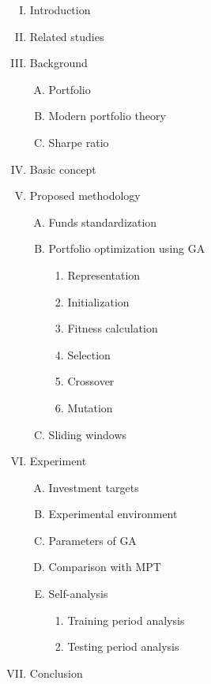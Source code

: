 \documentclass[polish,envcountsect,10pt]{article}
\begin{document}
\begin{enumerate}[I.]
    \item  Introduction
    \item  Related studies
    \item  Background
        \begin{enumerate}[A.]
          \item Portfolio
          \item Modern portfolio theory
          \item Sharpe ratio
        \end{enumerate}
    \item  Basic concept
    \item  Proposed methodology
        \begin{enumerate}[A.]
          \item Funds standardization
          \item Portfolio optimization using GA
            \begin{enumerate}[1)]
              \item Representation
              \item Initialization
              \item Fitness calculation
              \item Selection
              \item Crossover
              \item Mutation
            \end{enumerate}
          \item Sliding windows
        \end{enumerate}
    \item  Experiment
        \begin{enumerate}[A.]
          \item Investment targets
          \item Experimental environment
          \item Parameters of GA
          \item Comparison with MPT
          \item Self-analysis
            \begin{enumerate}[1)]
              \item Training period analysis
              \item Testing period analysis
            \end{enumerate}
        \end{enumerate}
    \item  Conclusion
\end{enumerate}
\end{document}
